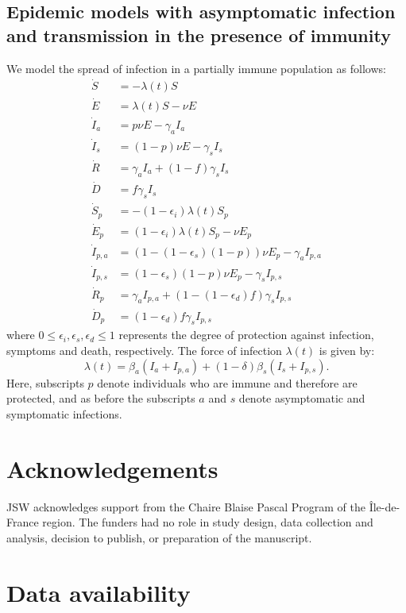 \documentclass[12pt]{article}
\begin{document}
\subsection*{Epidemic models with asymptomatic infection and transmission in the presence of immunity}

We model the spread of infection in a partially immune population as follows:
\begin{align}
\dot{S} &= -\lambda (t) S \\
\dot{E} &= \lambda (t) S - \nu E\\
\dot{I}_a &= p \nu E - \gamma_a I_a\\
\dot{I}_s &= (1-p) \nu E -\gamma_s I_s\\
\dot{R} &= \gamma_a I_a + (1-f) \gamma_s I_s \\
\dot{D} &= f \gamma_s I_s\\
\dot{S}_p &= - (1-\epsilon_i) \lambda (t) S_p \\
\dot{E}_p &= (1-\epsilon_i) \lambda (t) S_p - \nu E_p\\
\dot{I}_{p, a} &= (1 - (1-\epsilon_s) (1-p)) \nu E_p - \gamma_a I_{p,a}\\
\dot{I}_{p, s} &= (1-\epsilon_s) (1-p) \nu E_p -\gamma_s I_{p,s}\\
\dot{R}_p &= \gamma_a I_{p,a} + (1-(1-\epsilon_d) f) \gamma_s I_{p,s} \\
\dot{D}_p &= (1-\epsilon_d) f \gamma_s I_{p,s}
\end{align}
where $0\leq \epsilon_i, \epsilon_s, \epsilon_d \leq 1$ represents the degree of protection against infection, symptoms and death, respectively. 
The force of infection $\lambda(t)$ is given by:
\begin{equation}
\lambda(t) = \beta_a (I_a + I_{p,a}) + (1-\delta) \beta_s (I_s + I_{p,s}).
\end{equation}
Here, subscripts $p$ denote individuals who are immune and therefore are protected, and as before the subscripts $a$ and $s$ denote asymptomatic and symptomatic infections.

\section*{Acknowledgements}

JSW acknowledges support from the Chaire Blaise Pascal Program of the Île-de-France region.
The funders had no role in study design, data collection and analysis, decision to publish, or preparation of the manuscript. 

\section*{Data availability}
\end{document}
